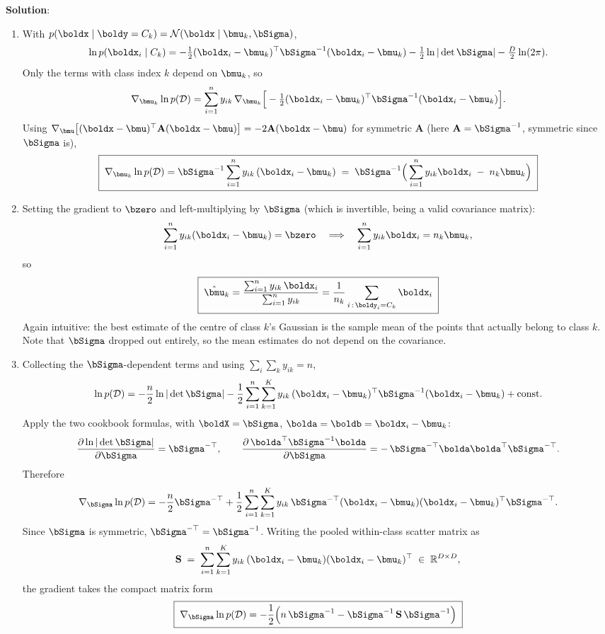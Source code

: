 \documentclass[submit]{../harvardml}
\newenvironment{solution}{
    \vspace{2mm}
    \color{blue}\noindent\textbf{Solution}:
}{}
\begin{document}
\begin{solution}
\begin{enumerate}
\item
With $p(\boldx \mid \boldy = C_k) = \mathcal N(\boldx \mid \bmu_k, \bSigma)$,
\[
  \ln p(\boldx_i \mid C_k)
  = -\tfrac12 (\boldx_i - \bmu_k)^\top \bSigma^{-1}(\boldx_i - \bmu_k)
    - \tfrac12 \ln|\det\bSigma| - \tfrac{D}{2}\ln(2\pi).
\]
Only the terms with class index $k$ depend on $\bmu_k$, so
\[
  \nabla_{\bmu_k} \ln p(\mathcal D)
  = \sum_{i=1}^{n} y_{ik}\,\nabla_{\bmu_k}\Big[-\tfrac12(\boldx_i-\bmu_k)^\top\bSigma^{-1}(\boldx_i-\bmu_k)\Big].
\]
Using $\nabla_{\bmu}\big[(\boldx-\bmu)^\top \mathbf A (\boldx-\bmu)\big] = -2\mathbf A(\boldx-\bmu)$
for symmetric $\mathbf A$ (here $\mathbf A = \bSigma^{-1}$, symmetric since $\bSigma$ is),
\[
  \boxed{\;
  \nabla_{\bmu_k}\ln p(\mathcal D)
  = \bSigma^{-1}\sum_{i=1}^{n} y_{ik}\,(\boldx_i - \bmu_k)
  \;=\; \bSigma^{-1}\Big(\sum_{i=1}^{n} y_{ik}\boldx_i \;-\; n_k\bmu_k\Big) \;}
\]

\item
Setting the gradient to $\bzero$ and left-multiplying by $\bSigma$ (which is
invertible, being a valid covariance matrix):
\[
  \sum_{i=1}^{n} y_{ik}(\boldx_i - \bmu_k) = \bzero
  \quad\Longrightarrow\quad
  \sum_{i=1}^{n} y_{ik}\boldx_i = n_k \bmu_k ,
\]
so
\[
  \boxed{\;\hat\bmu_k = \frac{\sum_{i=1}^{n} y_{ik}\,\boldx_i}{\sum_{i=1}^{n} y_{ik}}
   = \frac{1}{n_k}\sum_{i\,:\,\boldy_i = C_k} \boldx_i \;}
\]
Again intuitive: the best estimate of the centre of class $k$'s Gaussian is the sample
mean of the points that actually belong to class $k$. Note that $\bSigma$ dropped out
entirely, so the mean estimates do not depend on the covariance.

\item
Collecting the $\bSigma$-dependent terms and using $\sum_i \sum_k y_{ik} = n$,
\[
  \ln p(\mathcal D)
  = -\frac{n}{2}\ln|\det\bSigma|
    - \frac12 \sum_{i=1}^{n}\sum_{k=1}^{K} y_{ik}\,(\boldx_i-\bmu_k)^\top\bSigma^{-1}(\boldx_i-\bmu_k)
    + \text{const}.
\]
Apply the two cookbook formulas, with
$\boldX = \bSigma$, $\bolda = \boldb = \boldx_i - \bmu_k$:
\[
  \frac{\partial \ln|\det\bSigma|}{\partial\bSigma} = \bSigma^{-\top},
  \qquad
  \frac{\partial\, \bolda^\top\bSigma^{-1}\bolda}{\partial\bSigma}
  = -\,\bSigma^{-\top}\bolda\bolda^\top\bSigma^{-\top}.
\]
Therefore
\[
  \nabla_{\bSigma}\ln p(\mathcal D)
  = -\frac n2 \bSigma^{-\top}
    + \frac12\sum_{i=1}^{n}\sum_{k=1}^{K} y_{ik}\,
      \bSigma^{-\top}(\boldx_i-\bmu_k)(\boldx_i-\bmu_k)^\top\bSigma^{-\top}.
\]
Since $\bSigma$ is symmetric, $\bSigma^{-\top} = \bSigma^{-1}$. Writing the pooled
within-class scatter matrix as
\[
  \mathbf S \;=\; \sum_{i=1}^{n}\sum_{k=1}^{K} y_{ik}\,(\boldx_i - \bmu_k)(\boldx_i - \bmu_k)^\top
  \;\in\;\mathbb{R}^{D\times D},
\]
the gradient takes the compact matrix form
\[
  \boxed{\;
  \nabla_{\bSigma}\ln p(\mathcal D)
  = -\frac12\Big(n\,\bSigma^{-1} - \bSigma^{-1}\,\mathbf S\,\bSigma^{-1}\Big) \;}
\]


\end{enumerate}
\end{solution}
\end{document}
